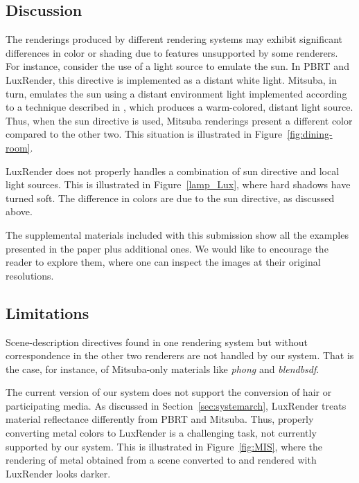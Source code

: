 \subsection{Discussion}

The renderings produced by different rendering systems may exhibit significant differences in color or shading due to features unsupported by some renderers.  
For instance, consider the use of a light source to emulate the sun. In PBRT and LuxRender, this directive is implemented as a distant white light.
Mitsuba, in turn, emulates the sun using a distant environment light implemented according to a technique 
described in \cite{Preetham}, which produces a warm-colored, distant light source. Thus, when the sun directive is used, Mitsuba renderings present a different color compared to the other two. This situation is illustrated in Figure~\ref{fig:dining-room}.

LuxRender does not properly handles a combination of sun directive and local light sources. This is illustrated in Figure~\ref{lamp_Lux}, where hard shadows have turned soft. The difference in colors are due to the sun directive, as discussed above.

The supplemental materials included with this submission show all the examples presented in the paper plus additional ones. We would like to encourage the reader to explore them, where one can inspect the images at their original resolutions.

\subsection{Limitations}
Scene-description directives found in one rendering system but without correspondence in the other two renderers are not handled by our system. That is the case, for instance, of Mitsuba-only materials like \textit{phong} and \textit{blendbsdf}. 

The current version of our system does not support the conversion of hair or participating media. 
%
As discussed in Section~\ref{sec:systemarch}, LuxRender treats material reflectance differently from PBRT and Mitsuba. Thus, properly converting metal colors to LuxRender is a challenging task, not currently supported by our system. This is illustrated in Figure~\ref{fig:MIS}, where the rendering of metal obtained from a scene converted to and rendered with LuxRender looks darker.  

